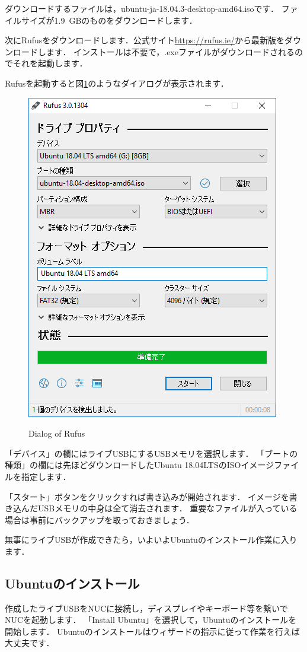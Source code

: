 \documentclass[{../../master}]{subfiles}
\begin{document}
ダウンロードするファイルは，\textsf{ubuntu-ja-18.04.3-desktop-amd64.iso}です．
ファイルサイズが\SI{1.9}{GB}のものをダウンロードします．

次に\textsf{Rufus}をダウンロードします．公式サイト\url{https://rufus.ie/}から最新版をダウンロードします．
インストールは不要で，\textsf{.exe}ファイルがダウンロードされるのでそれを起動します．

\textsf{Rufus}を起動すると図\ref{fig:rufus}のようなダイアログが表示されます．

\begin{figure}
  \centering
  \includegraphics[width=65truemm, clip]{images/rufus_jp.png}
  \label{fig:rufus}
  \caption{Dialog of Rufus}
\end{figure}

\noindent
「デバイス」の欄にはライブUSBにするUSBメモリを選択します．
「ブートの種類」の欄には先ほどダウンロードしたUbuntu 18.04LTSのISOイメージファイルを指定します．

「スタート」ボタンをクリックすれば書き込みが開始されます．
イメージを書き込んだUSBメモリの中身は全て消去されます．
重要なファイルが入っている場合は事前にバックアップを取っておきましょう．

無事にライブUSBが作成できたら，いよいよUbuntuのインストール作業に入ります．

\subsection{Ubuntuのインストール}

作成したライブUSBをNUCに接続し，ディスプレイやキーボード等を繋いでNUCを起動します．
「Install Ubuntu」を選択して，Ubuntuのインストールを開始します．
Ubuntuのインストールはウィザードの指示に従って作業を行えば大丈夫です．
\end{document}
